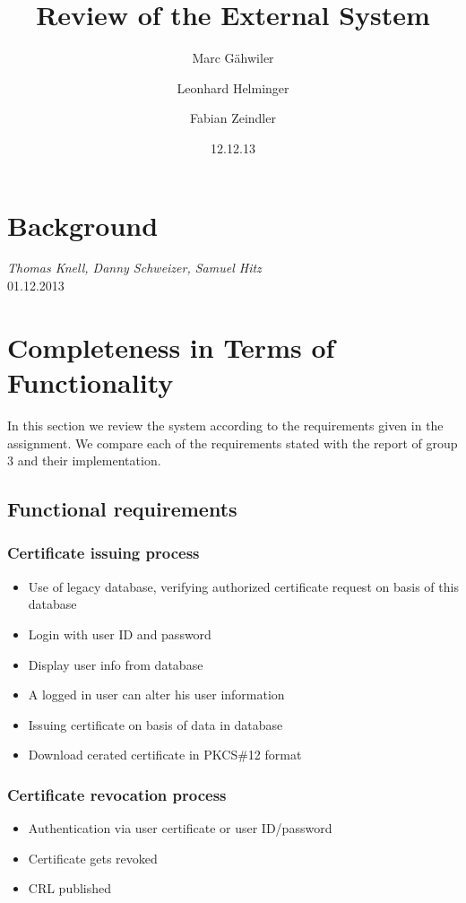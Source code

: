 \documentclass{article}
\title{\huge\sffamily\bfseries Review of the External System}
\author{Marc G\"ahwiler \and Leonhard Helminger \and Fabian Zeindler}
\date{12.12.13}
\begin{document}
\maketitle

\tableofcontents
\pagebreak

\section{Background}

 {\it Thomas Knell, Danny Schweizer, Samuel Hitz} \\

 01.12.2013

\section{Completeness in Terms of Functionality} 
In this section we review the system according to the requirements given in the assignment. We compare each of the requirements stated with the report of group 3 and their implementation.
\subsection{Functional requirements}
\subsubsection{Certificate issuing process}
\begin{itemize}
\item Use of legacy database, verifying authorized certificate request on basis of this database \checkmark 
\item Login with user ID and password \checkmark
\item Display user info from database \checkmark
\item A logged in user can alter his user information \checkmark
\item Issuing certificate on basis of data in database \checkmark
\item Download cerated certificate in PKCS\#12 format \checkmark
\end{itemize}
\subsubsection{Certificate revocation process}
\begin{itemize}
\item Authentication via user certificate or user ID/password \checkmark
\item Certificate gets revoked \checkmark
\item CRL published \checkmark
\end{itemize}
\end{document}
